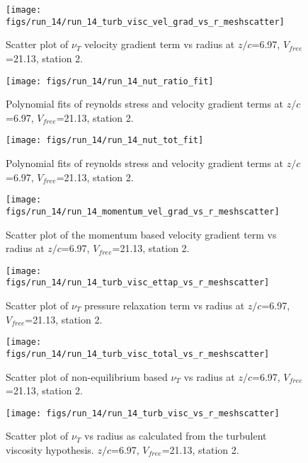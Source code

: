 \begin{figure}[H]
\centering
\texttt{[image: figs/run\_14/run\_14\_turb\_visc\_vel\_grad\_vs\_r\_meshscatter]}
\caption{Scatter plot of $\nu_T$ velocity gradient term vs radius at $z/c$=6.97, $V_{free}$=21.13, station 2.}
\end{figure}


\begin{figure}[H]
\centering
\texttt{[image: figs/run\_14/run\_14\_nut\_ratio\_fit]}
\caption{Polynomial fits of reynolds stress and velocity gradient terms at $z/c$=6.97, $V_{free}$=21.13, station 2.}
\end{figure}


\begin{figure}[H]
\centering
\texttt{[image: figs/run\_14/run\_14\_nut\_tot\_fit]}
\caption{Polynomial fits of reynolds stress and velocity gradient terms at $z/c$=6.97, $V_{free}$=21.13, station 2.}
\end{figure}


\begin{figure}[H]
\centering
\texttt{[image: figs/run\_14/run\_14\_momentum\_vel\_grad\_vs\_r\_meshscatter]}
\caption{Scatter plot of the momentum based velocity gradient term vs radius at $z/c$=6.97, $V_{free}$=21.13, station 2.}
\end{figure}


\begin{figure}[H]
\centering
\texttt{[image: figs/run\_14/run\_14\_turb\_visc\_ettap\_vs\_r\_meshscatter]}
\caption{Scatter plot of $\nu_T$ pressure relaxation term vs radius at $z/c$=6.97, $V_{free}$=21.13, station 2.}
\end{figure}


\begin{figure}[H]
\centering
\texttt{[image: figs/run\_14/run\_14\_turb\_visc\_total\_vs\_r\_meshscatter]}
\caption{Scatter plot of non-equilibrium based $\nu_T$ vs radius at $z/c$=6.97, $V_{free}$=21.13, station 2.}
\end{figure}


\begin{figure}[H]
\centering
\texttt{[image: figs/run\_14/run\_14\_turb\_visc\_vs\_r\_meshscatter]}
\caption{Scatter plot of $\nu_T$ vs radius as calculated from the turbulent viscosity hypothesis. $z/c$=6.97, $V_{free}$=21.13, station 2.}
\end{figure}


